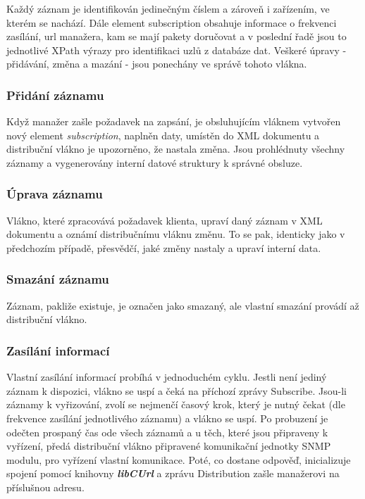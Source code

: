 Každý záznam je identifikován jedinečným číslem a zároveň i zařízením, ve kterém se nachází. Dále element subscription obsahuje informace o frekvenci zasílání, 
url manažera, kam se mají pakety doručovat a v poslední řadě jsou to jednotlivé XPath výrazy pro identifikaci uzlů z databáze dat.
Veškeré úpravy - přidávání, změna a mazání - jsou ponechány ve správě tohoto vlákna.

\subsubsection*{Přidání záznamu}
Když manažer zašle požadavek na zapsání, je obsluhujícím vláknem vytvořen nový element \textit{subscription}, naplněn daty, umístěn do XML dokumentu a 
distribuční vlákno je upozorněno, že nastala změna. Jsou prohlédnuty všechny záznamy a vygenerovány interní datové struktury k správné obsluze.

\subsubsection*{Úprava záznamu}
Vlákno, které zpracovává požadavek klienta, upraví daný záznam v XML dokumentu a oznámí distribučnímu vláknu změnu. To se pak, identicky jako v předchozím případě,
přesvědčí, jaké změny nastaly a upraví interní data.

\subsubsection*{Smazání záznamu}
Záznam, pakliže existuje, je označen jako smazaný, ale vlastní smazání provádí až distribuční vlákno.

\subsubsection*{Zasílání informací}
Vlastní zasílání informací probíhá v jednoduchém cyklu. Jestli není jediný záznam k dispozici, vlákno se uspí a čeká na příchozí zprávy Subscribe. Jsou-li záznamy
k vyřizování, zvolí se nejmenčí časový krok, který je nutný čekat (dle frekvence zasílání jednotlivého záznamu) a vlákno se uspí. Po probuzení je odečten
prospaný čas ode všech záznamů a u těch, které jsou připraveny k vyřízení, předá distribuční vlákno připravené komunikační jednotky SNMP modulu, pro vyřízení
vlastní komunikace. Poté, co dostane odpověď, inicializuje spojení pomocí knihovny \textbf{\textit{libCUrl}} a zprávu Distribution zašle manažerovi na příslušnou
adresu.

